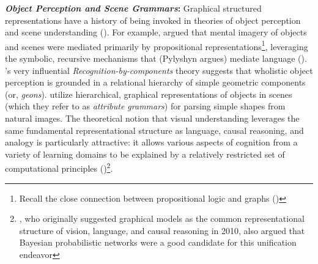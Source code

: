 \documentclass[12pt]{article}
\let\oldcite=\cite
\let\oldtextcite=\textcite
\renewcommand{\cite}[1]{\textcolor[rgb]{0, .121, .388}{\oldcite{#1}}}
\renewcommand{\textcite}[1]{\textcolor[rgb]{0, .121, .388}{\oldtextcite{#1}}}
\begin{document}
\textbf{\emph{Object Perception and Scene Grammars}:} Graphical structured representations have a history of being invoked in theories of object perception and scene understanding (\cite{pylyshyn1973mind,biederman1987recognition,hummel1992dynamic}). For example, \textcite{pylyshyn1973mind} argued that mental imagery of objects and scenes were mediated primarily by propositional representations\footnote{Recall the close connection between propositional logic and graphs (\cite{rensink2004representing})}, leveraging the symbolic, recursive mechanisms that (Pylyshyn argues) mediate language (\cite{chomsky1965aspects}). \textcite{biederman1987recognition}'s very influential \emph{Recognition-by-components} theory suggests that wholistic object perception is grounded in a relational hierarchy of simple geometric components (or, \emph{geons}). \textcite{han2008bottom} utilize hierarchical, graphical representations of objects in scenes (which they refer to as \emph{attribute grammars}) for parsing simple shapes from natural images. The theoretical notion that visual understanding leverages the same fundamental representational structure as language, causal reasoning, and analogy is particularly attractive: it allows various aspects of cognition from a variety of learning domains to be explained by a relatively restricted set of computational principles (\cite{griffiths2010probabilistic})\footnote{\textcite{griffiths2010probabilistic}, who originally suggested graphical models as the common representational structure of vision, language, and causal reasoning in 2010, also argued that Bayesian probabilistic networks were a good candidate for this unification endeavor}.
\end{document}
